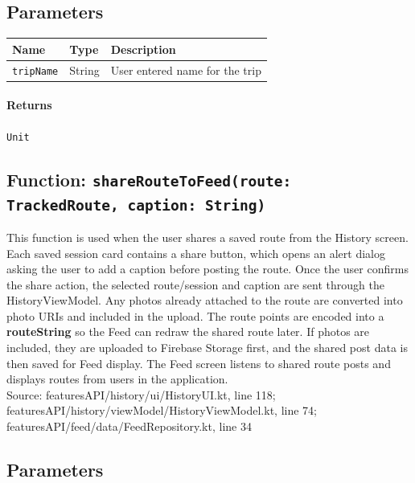 \documentclass{article}
\begin{document}
                \subsection*{Parameters}

                \begin{tabular}{p{3cm} p{4cm} p{7cm}}
                \toprule
                \textbf{Name} & \textbf{Type} & \textbf{Description} \\ \midrule
                \texttt{tripName} & String & User entered name for the trip
                \end{tabular}

                \paragraph{Returns} \texttt{Unit}

            \hrulefill

            \subsection*{Function: \texttt{shareRouteToFeed(route: TrackedRoute, caption: String)}}

                This function is used when the user shares a saved route from the History
                screen. Each saved session card contains a share button, which opens an alert
                dialog asking the user to add a caption before posting the route. Once the user
                confirms the share action, the selected route/session and caption are sent through
                the HistoryViewModel. Any photos already attached to the route are converted into
                photo URIs and included in the upload. The route points are encoded into a
                \textbf{routeString} so the Feed can redraw the shared route later. If photos are
                included, they are uploaded to Firebase Storage first, and the shared post data is
                then saved for Feed display. The Feed screen listens to shared route posts and
                displays routes from users in the application. \\
                Source: featuresAPI/history/ui/HistoryUI.kt, line 118; featuresAPI/history/viewModel/HistoryViewModel.kt, line 74; featuresAPI/feed/data/FeedRepository.kt, line 34

                \subsection*{Parameters}
\end{document}
